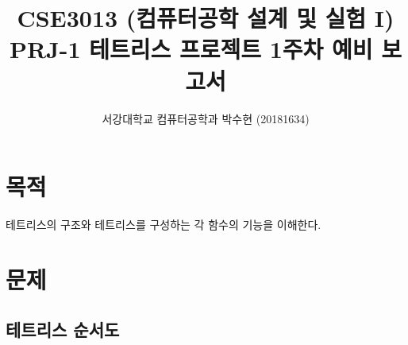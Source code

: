 
	


\title{CSE3013 (컴퓨터공학 설계 및 실험 I) \space \newline PRJ-1 테트리스 프로젝트 1주차 예비 보고서}
\author{서강대학교 컴퓨터공학과 박수현 (20181634)}
\maketitle

\section{목적}
테트리스의 구조와 테트리스를 구성하는 각 함수의 기능을 이해한다.

\newpage

\section{문제}
\subsection{테트리스 순서도}

